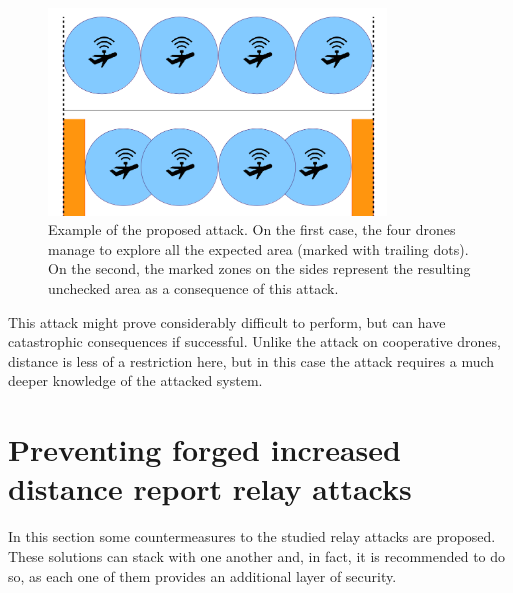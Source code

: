 \documentclass{article}
\begin{document}
\begin{description}
  \begin{figure}[h!]
  \centering
    \includegraphics[width=0.8\textwidth]{images/attack2.png}
  \caption{Example of the proposed attack. On the first case, the four drones manage to explore all the expected area (marked with trailing dots). On the second, the marked zones on the sides represent the resulting unchecked area as a consequence of this attack.}
  \label{fig:attackexample2}
\end{figure}

This attack might prove considerably difficult to perform, but can have catastrophic consequences if successful. Unlike the attack on cooperative drones, distance is less of a restriction here, but in this case the attack requires a much deeper knowledge of the attacked system.\\

\end{description}



















\section{Preventing forged increased distance report relay attacks}
\label{sec:prevention}

In this section some countermeasures to the studied relay attacks are proposed. These solutions can stack with one another and, in fact, it is recommended to do so, as each one of them provides an additional layer of security.\\
\end{document}
